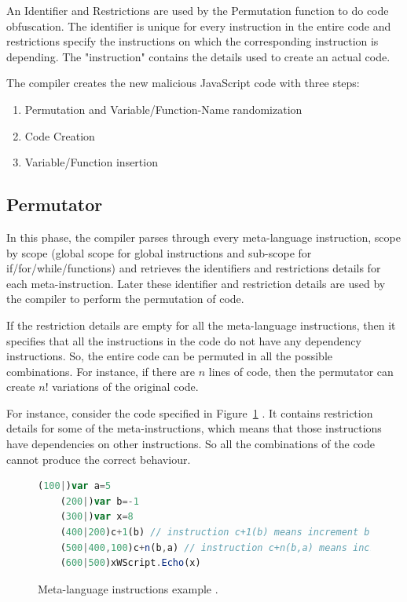 An Identifier and Restrictions are used by the Permutation function to do code obfuscation. The identifier is unique for every instruction in the entire code and restrictions specify the instructions on which the corresponding instruction is depending. The "instruction" contains the details used to create an actual code. 

The compiler creates the new malicious JavaScript code with three steps:

\begin{enumerate}
  \item Permutation and Variable/Function-Name randomization
  \item Code Creation
  \item Variable/Function insertion
\end{enumerate}

\subsection{Permutator}

In this phase, the compiler parses through every meta-language instruction, scope by scope (global scope for global instructions and sub-scope for if/for/while/functions) and retrieves the identifiers and restrictions details for each meta-instruction. Later these identifier and restriction details are used by the compiler to perform the permutation of code.

If the restriction details are empty for all the meta-language instructions, then it specifies that all the instructions in the code do not have any dependency instructions. So, the entire code can be permuted in all the possible combinations. For instance, if there are $n$ lines of code, then the permutator can create $n!$ variations of the original code. 

For instance, consider the code specified in Figure~\ref{fig:permutator} \cite{bib4}. It contains restriction details for some of the meta-instructions, which means that those instructions have dependencies on other instructions. So all the combinations of the code cannot produce the correct behaviour. 


\begin{figure}
  \centering
  \begin{lstlisting}[language=JavaScript]
	(100|)var a=5
	(200|)var b=-1
	(300|)var x=8
	(400|200)c+1(b)	// instruction c+1(b) means increment b by 1: i.e. b++
	(500|400,100)c+n(b,a) // instruction c+n(b,a) means increment b by a: i.e. b+=a
	(600|500)xWScript.Echo(x)
\end{lstlisting}

    \caption[Meta-language instructions example]{Meta-language instructions example \cite{bib4}.}
    \label{fig:permutator}
\end{figure}


